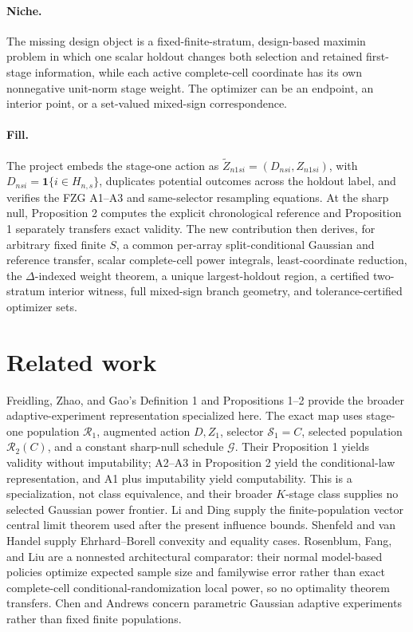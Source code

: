 \documentclass{article}
\begin{document}
\paragraph{Niche.} The missing design object is a fixed-finite-stratum, design-based maximin problem in which one scalar holdout changes both selection and retained first-stage information, while each active complete-cell coordinate has its own nonnegative unit-norm stage weight. The optimizer can be an endpoint, an interior point, or a set-valued mixed-sign correspondence.

\paragraph{Fill.} The project embeds the stage-one action as \(\widetilde Z_{n1si}=(D_{nsi},Z_{n1si})\), with \(D_{nsi}=\mathbf 1\{i\in H_{n,s}\}\), duplicates potential outcomes across the holdout label, and verifies the FZG A1--A3 and same-selector resampling equations. At the sharp null, Proposition 2 computes the explicit chronological reference and Proposition 1 separately transfers exact validity. The new contribution then derives, for arbitrary fixed finite \(S\), a common per-array split-conditional Gaussian and reference transfer, scalar complete-cell power integrals, least-coordinate reduction, the \(\Delta\)-indexed weight theorem, a unique largest-holdout region, a certified two-stratum interior witness, full mixed-sign branch geometry, and tolerance-certified optimizer sets.

\section{Related work}

Freidling, Zhao, and Gao's Definition 1 and Propositions 1--2 provide the broader adaptive-experiment representation specialized here. The exact map uses stage-one population \(\mathcal R_1\), augmented action \(D,Z_1\), selector \(\mathcal S_1=C\), selected population \(\mathcal R_2(C)\), and a constant sharp-null schedule \(\mathcal G\). Their Proposition 1 yields validity without imputability; A2--A3 in Proposition 2 yield the conditional-law representation, and A1 plus imputability yield computability. This is a specialization, not class equivalence, and their broader \(K\)-stage class supplies no selected Gaussian power frontier. Li and Ding supply the finite-population vector central limit theorem used after the present influence bounds. Shenfeld and van Handel supply Ehrhard--Borell convexity and equality cases. Rosenblum, Fang, and Liu are a nonnested architectural comparator: their normal model-based policies optimize expected sample size and familywise error rather than exact complete-cell conditional-randomization local power, so no optimality theorem transfers. Chen and Andrews concern parametric Gaussian adaptive experiments rather than fixed finite populations.
\end{document}
